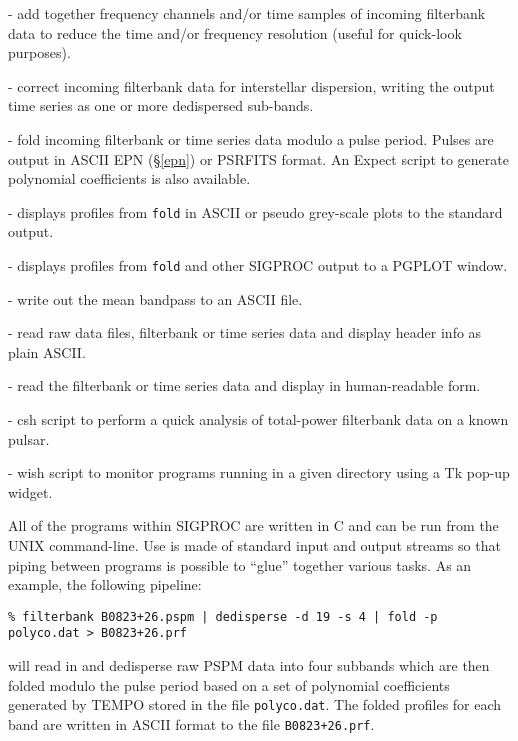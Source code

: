 \documentclass[11pt]{article}
\begin{document}
\smallskip
{} - add together frequency channels
and/or time samples of incoming filterbank data to reduce
the time and/or frequency resolution (useful for quick-look
purposes).

\smallskip
{} - correct incoming filterbank data
for interstellar dispersion, writing the output time series as
one or more dedispersed sub-bands.

\smallskip
{} - fold incoming filterbank or time series
data modulo a pulse period. Pulses are output in ASCII
EPN (\S \ref{epn}) or PSRFITS format. An Expect script to 
generate polynomial coefficients is also available.

\smallskip
{} - displays profiles from {\tt fold} in
ASCII or pseudo grey-scale plots to the standard output.

\smallskip
{} - displays profiles from {\tt fold} 
and other SIGPROC output to a PGPLOT window.

\smallskip
{} - write out the mean bandpass to an ASCII file.

\smallskip
{} - read raw data files,
filterbank or time series data and display header info as plain ASCII.

\smallskip
{} - read the filterbank or time series
data and display in human-readable form.

\smallskip
{} - csh script to perform a quick
analysis of total-power filterbank data on a known pulsar.

\smallskip
{} - wish script to
monitor programs running in a given
directory using a Tk pop-up widget.

\bigskip
\noindent
All of the programs within SIGPROC are written in C and can be run
from the UNIX command-line. Use is made of standard input and output
streams so that piping between programs is possible to ``glue''
together various tasks. As an example, the following pipeline:
\begin{verbatim}
% filterbank B0823+26.pspm | dedisperse -d 19 -s 4 | fold -p polyco.dat > B0823+26.prf
\end{verbatim}
will read in and dedisperse raw PSPM data into four subbands which are
then folded modulo the pulse period based on a set of polynomial
coefficients generated by TEMPO stored in the file {\tt polyco.dat}.
The folded profiles for each band are written in ASCII format
to the file {\tt B0823+26.prf}.  
\end{document}
